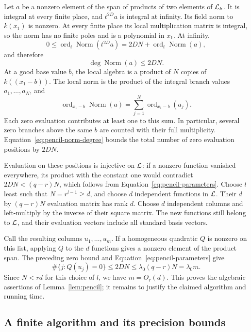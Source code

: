 Let $a$ be a nonzero element of the span of products of two elements
of $\mathcal L_k$.  It is integral at every finite place, and $t^{2D}a$ is
integral at infinity.  Its field norm to $k(x_1)$ is nonzero.  At every
finite place its local multiplication matrix is integral, so the norm
has no finite poles and is a polynomial in $x_1$.  At infinity,
\[
 0\leq\operatorname{ord}_t\operatorname{Norm}(t^{2D}a)
   =2DN+\operatorname{ord}_t\operatorname{Norm}(a),
\]
and therefore
\begin{equation}\label{eq:pencil-norm-degree}
 \deg\operatorname{Norm}(a)\leq2DN.
\end{equation}
At a good base value $b$, the local algebra is a product of $N$ copies
of $k((x_1-b))$.  The local norm is the product of the integral branch
values $a_1,\ldots,a_N$, and
\[
 \operatorname{ord}_{x_1-b}\operatorname{Norm}(a)
   =\sum_{j=1}^N\operatorname{ord}_{x_1-b}(a_j).
\]
Each zero evaluation contributes at least one to this sum.  In
particular, several zero branches above the same $b$ are counted with
their full multiplicity.  Equation~\ref{eq:pencil-norm-degree} bounds
the total number of zero evaluation positions by $2DN$.

Evaluation on these positions is injective on $\mathcal L$: if a nonzero
function vanished everywhere, its product with the constant one would
contradict $2DN<(q-r)N$, which follows from
Equation~\ref{eq:pencil-parameters}.  Choose $l$ least such that
$N=r^{l-1}\geq d$, and choose $d$ independent functions in $\mathcal L$.
Their $d$ by $(q-r)N$ evaluation matrix has rank $d$.  Choose $d$
independent columns and left-multiply by the inverse of their square
matrix.  The new functions still belong to $\mathcal L$, and their evaluation
vectors include all standard basis vectors.

Call the resulting columns $u_1,\ldots,u_m$.  If a homogeneous
quadratic $Q$ is nonzero on this list, applying $Q$ to the $d$ functions
gives a nonzero element of the product span.  The preceding zero bound
and Equation~\ref{eq:pencil-parameters} give
\[
 \#\{j:Q(u_j)=0\}\leq2DN\leq\lambda_0(q-r)N=\lambda_0m.
\]
Since $N<rd$ for this choice of $l$, we have $m=O_r(d)$.
This proves the algebraic assertions of Lemma~\ref{lem:pencil}; it remains
to justify the claimed algorithm and running time.

\subsection{A finite algorithm and its precision bounds}

